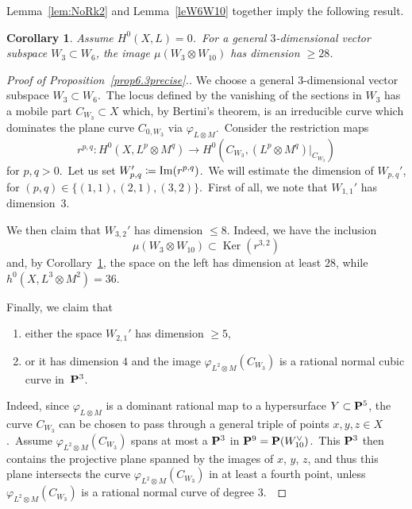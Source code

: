 \documentclass[12pt]{amsart}
\def\P{{\bf P}}
\def\phi{\varphi}
\def\Im{\mathop{\rm Im}\nolimits}
\DeclareMathOperator{\Ker}{Ker}
\def\otp{}
\def\ot{\otimes}
\def\lra{\longrightarrow}
\newtheorem{coro}[lemm]{Corollary}
\theoremstyle{remark}
\begin{document}
Lemma~\ref{lem:NoRk2} and Lemma~\ref{leW6W10} together imply the following result.

\begin{coro}\label{lealternative}
Assume $H^0(X,L)=0$.\ For a general $3$-dimensional vector subspace $W_3\subset W_6$, the image $\mu(W_3\ot  W_{10})$ has dimension $\geq 28$.
\end{coro}

\begin{proof}[Proof of Proposition~\ref{prop6.3precise}.]
We choose a general $3$-dimensional vector subspace $W_3\subset W_6$.\
The locus
defined by the vanishing of the sections in $W_3$ has a mobile part $C_{W_3}\subset X$ which, by Bertini's theorem, is an irreducible curve
which   dominates the  plane curve $C_{0,W_3}$ via $\phi_{L\otimes M}$.\ Consider the restriction maps
\[
r^{p,q}\colon H^0(X,L^{\otp p}\otimes M^{\otp q})\lra  H^0(C_{W_3},(L^{\otp p}\otimes M^{\otp q})\vert_{C_{W_3}})
\]
for $p,q>0$.\
Let us set $W_{p,q}'\coloneqq \Im(r^{p,q})$.\
We will estimate the dimension of $W_{p,q}'$, for $(p,q)\in\{(1,1),(2,1), (3,2)\}$.\
First of all, we note that $W_{1,1}'$ has dimension~3.

We then claim that $W_{3,2}'$ has dimension $\leq 8$.
Indeed, we have the inclusion
\[
\mu(W_3\ot W_{10})\subset \Ker (r^{3,2})
\]
and, by Corollary~\ref{lealternative},   the space on the left has dimension at least $28$, while $h^0(X,L^{\otp 3}\otimes M^{\otp 2})=36$.

Finally, we claim that
\begin{enumerate}[{\rm (a)}]
\item\label{enum:claim1_part1} either the space $W_{2,1}'$ has dimension $\geq 5$,
\item\label{enum:claim1_part2} or it has dimension $4$ and the image $\phi_{L^{\otp 2}\otimes M}( C_{W_3})$ is a rational normal cubic curve in~$\P^3$.
\end{enumerate}
Indeed, since $\phi_{L\otimes M}$ is a dominant rational map to a hypersurface $Y\subset \P^5$, the curve $C_{W_3}$ can be chosen to pass through a  general triple of points $x,y,z\in X$.\
Assume  $\phi_{L^{\otp 2}\otimes M}( C_{W_3})$ spans at most a $\P^3$ in $\P^9=\P(W_{10}^\vee)$.\
This $\P^3$ then contains the projective plane  spanned by the images of $x$, $y$,  $z$, and thus this plane intersects the curve $\phi_{L^{\otp 2}\otimes M}(C_{W_3})$ in at least a fourth point, unless   $\phi_{L^{\otp 2}\otimes M}(C_{W_3})$ is a rational normal curve of degree $3$.\


\end{proof}
\end{document}
